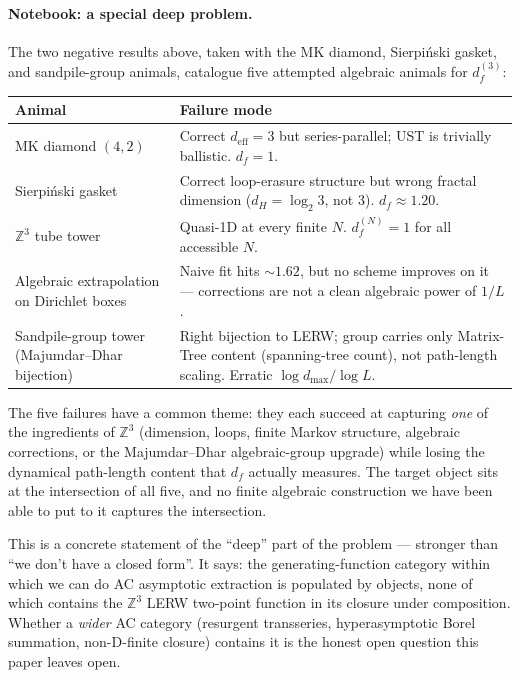 \documentclass[10pt,a4paper,twocolumn]{article}
\theoremstyle{plain}
\theoremstyle{definition}
\begin{document}
\paragraph{Notebook: a special deep problem.}
The two negative results above, taken with the MK diamond,
Sierpi\'nski gasket, and sandpile-group animals, catalogue five
attempted algebraic animals for $d_f^{(3)}$:
\begin{center}
{\small
\begin{tabular}{@{}p{}p{}@{}}
\toprule
Animal & Failure mode \\
\midrule
MK diamond $(4, 2)$
 & Correct $d_\text{eff} = 3$ but series-parallel; UST is
   trivially ballistic. $d_f = 1$. \\
Sierpi\'nski gasket
 & Correct loop-erasure structure but wrong fractal dimension
   ($d_H = \log_2 3$, not 3). $d_f \approx 1.20$. \\
$\mathbb{Z}^3$ tube tower
 & Quasi-1D at every finite $N$. $d_f^{(N)} = 1$ for all
   accessible $N$. \\
Algebraic extrapolation on Dirichlet boxes
 & Naive fit hits $\sim 1.62$, but no scheme improves on it ---
   corrections are not a clean algebraic power of $1/L$. \\
Sandpile-group tower (Majumdar--Dhar bijection)
 & Right bijection to LERW; group carries only Matrix-Tree
   content (spanning-tree count), not path-length scaling.
   Erratic $\log d_{\max}/\log L$. \\
\bottomrule
\end{tabular}
}
\end{center}

\noindent The five failures have a common theme: they each succeed
at capturing \emph{one} of the ingredients of $\mathbb{Z}^3$
(dimension, loops, finite Markov structure, algebraic corrections,
or the Majumdar--Dhar algebraic-group upgrade) while losing the
dynamical path-length content that $d_f$ actually measures.  The
target object sits at the intersection of all five, and no finite
algebraic construction we have been able to put to it captures the
intersection.

This is a concrete statement of the ``deep'' part of the problem
--- stronger than ``we don't have a closed form''.  It says: the
generating-function category within which we can do AC asymptotic
extraction is populated by objects, none of which contains the
$\mathbb{Z}^3$ LERW two-point function in its closure under
composition.  Whether a \emph{wider} AC category (resurgent
transseries, hyperasymptotic Borel summation, non-D-finite
closure) contains it is the honest open question this paper
leaves open.
\end{document}
